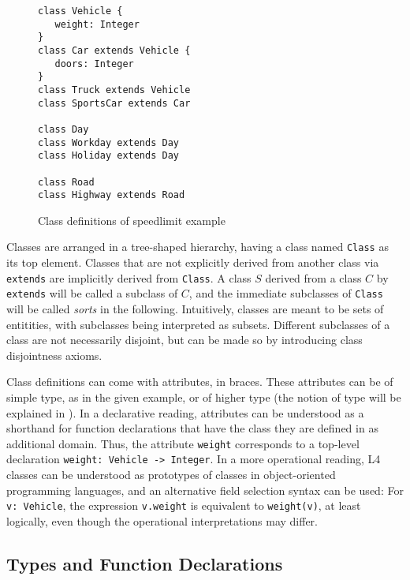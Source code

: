 \begin{figure}[h!]
\begin{lstlisting}
class Vehicle {
   weight: Integer
}
class Car extends Vehicle {
   doors: Integer
}
class Truck extends Vehicle
class SportsCar extends Car

class Day
class Workday extends Day
class Holiday extends Day

class Road
class Highway extends Road
\end{lstlisting}
  \caption{Class definitions of speedlimit example}\label{fig:classdefs}
\end{figure}

Classes are arranged in a tree-shaped hierarchy, having a class named
\texttt{Class} as its top element. Classes that are not explicitly derived
from another class via \texttt{extends} are implicitly derived from
\texttt{Class}. A class $S$ derived from a class $C$ by \texttt{extends} will
be called a subclass of $C$, and the immediate subclasses of \texttt{Class}
will be called \emph{sorts} in the following. Intuitively, classes are meant
to be sets of entitities, with subclasses being interpreted as
subsets. Different subclasses of a class are not necessarily disjoint, but can
be made so by introducing class disjointness axioms.

Class definitions can come with attributes, in braces. These attributes can be
of simple type, as in the given example, or of higher type (the notion of type
will be explained in ). In a declarative reading,
attributes can be understood as a shorthand for function declarations that
have the class they are defined in as additional domain. Thus, the attribute
\texttt{weight} corresponds to a top-level declaration \texttt{weight: Vehicle
  -> Integer}. In a more operational reading, L4 classes can be understood as
prototypes of classes in object-oriented programming languages, and an
alternative field selection syntax can be used: For \texttt{v: Vehicle}, the
expression \texttt{v.weight} is equivalent to \texttt{weight(v)}, at least
logically, even though the operational interpretations may differ.


\subsection{Types and Function Declarations}\label{sec:fundecls}

